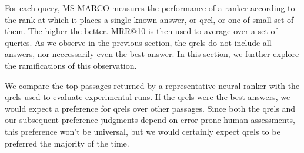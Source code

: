 \documentclass[fullpage]{article}
\begin{document}
For each query, MS MARCO measures the performance of a ranker according to the rank at which it places a single known answer, or qrel, or one of small set of them. The higher the better. MRR@10 is then used to average over a set of queries. As we observe in the previous section, the qrels do not include all answers, nor neccessarily even the best answer. In this section, we further explore the ramifications of this observation.

We compare the top passages returned by a representative neural ranker with the qrels used to evaluate experimental runs. If the qrels were the best answers, we would expect a preference for qrels over other passages. Since both the qrels and our subsequent preference judgments depend on error-prone human assessments, this preference won't be universal, but we would certainly expect qrels to be preferred the majority of the time.
\end{document}
